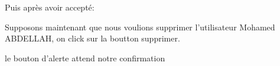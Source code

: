 \documentclass{article}
\begin{document}
\begin{enumerate}
  
   
  \vspace{0.7cm}
               \hspace*{-0.7in}
               \noindent{}
  
  
   Puis après avoir accepté:
  
  \vspace{0.7cm}
               \hspace*{-0.7in}

               \noindent{}
  
  
  
  Supposons maintenant que nous voulions supprimer l'utilisateur Mohamed ABDELLAH, on click sur la boutton supprimer.
  
  le bouton d'alerte attend notre confirmation
  
\vspace{0.7cm}
               \hspace*{-0.7in}


\end{enumerate}
\end{document}
